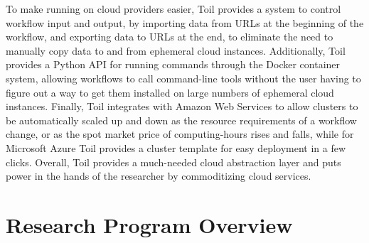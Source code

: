 To make running on cloud providers easier, Toil provides a system to control workflow input and output, by importing data from URLs at the beginning of the workflow, and exporting data to URLs at the end, to eliminate the need to manually copy data to and from ephemeral cloud instances. Additionally, Toil provides a Python API for running commands through the Docker container system, allowing workflows to call command-line tools without the user having to figure out a way to get them installed on large numbers of ephemeral cloud instances. Finally, Toil integrates with Amazon Web Services to allow clusters to be automatically scaled up and down as the resource requirements of a workflow change, or as the spot market price of computing-hours rises and falls, while for Microsoft Azure Toil provides a cluster template for easy deployment in a few clicks. Overall, Toil provides a much-needed cloud abstraction layer and puts power in the hands of the researcher by commoditizing cloud services.

    


\section{Research Program Overview}


